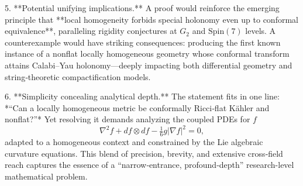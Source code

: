 5. **Potential unifying implications.**  
   A proof would reinforce the emerging principle that **local homogeneity forbids special holonomy even up to conformal equivalence**, paralleling rigidity conjectures at \(G_2\) and \(\mathrm{Spin}(7)\) levels. A counterexample would have striking consequences: producing the first known instance of a nonflat locally homogeneous geometry whose conformal transform attains Calabi–Yau holonomy—deeply impacting both differential geometry and string‑theoretic compactification models.  

6. **Simplicity concealing analytical depth.**  
   The statement fits in one line: *“Can a locally homogeneous metric be conformally Ricci‑flat Kähler and nonflat?”* Yet resolving it demands analyzing the coupled PDEs for \(f\)
   \[
   \nabla^2 f + df\otimes df - \tfrac{1}{6} g|\nabla f|^2 = 0,
   \]
   adapted to a homogeneous context and constrained by the Lie algebraic curvature equations.  
   This blend of precision, brevity, and extensive cross‑field reach captures the essence of a “narrow‑entrance, profound‑depth” research-level mathematical problem.